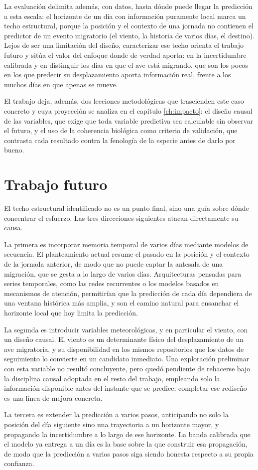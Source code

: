 La evaluación delimita además, con datos, hasta dónde puede llegar la predicción a esta
escala: el horizonte de un día con información puramente local marca un techo
estructural, porque la posición y el contexto de una jornada no contienen el predictor de
un evento migratorio (el viento, la historia de varios días, el destino). Lejos de ser
una limitación del diseño, caracterizar ese techo orienta el trabajo futuro y sitúa el
valor del enfoque donde de verdad aporta: en la incertidumbre calibrada y en distinguir los días en que el ave
está migrando, que son los pocos en los que predecir su desplazamiento aporta
información real, frente a los muchos días en que apenas se mueve.

El trabajo deja, además, dos lecciones metodológicas que trascienden este caso concreto
y cuya proyección se analiza en el capítulo \ref{ch:impacto}: el diseño causal de las
variables, que exige que toda variable predictiva sea calculable sin observar el futuro,
y el uso de la coherencia biológica como criterio de validación, que contrasta cada
resultado contra la fenología de la especie antes de darlo por bueno.

\section{Trabajo futuro}
\label{sec:concl-futuro}

El techo estructural identificado no es un punto final, sino una guía sobre dónde
concentrar el esfuerzo. Las tres direcciones siguientes atacan directamente su causa.

La primera es incorporar memoria temporal de varios días mediante modelos de secuencia.
El planteamiento actual resume el pasado en la posición y el contexto de la jornada
anterior, de modo que no puede captar la antesala de una migración, que se gesta a lo
largo de varios días. Arquitecturas pensadas para series temporales, como las redes
recurrentes o los modelos basados en mecanismos de atención, permitirían que la
predicción de cada día dependiera de una ventana histórica más amplia, y son el camino
natural para ensanchar el horizonte local que hoy limita la predicción.

La segunda es introducir variables meteorológicas, y en particular el viento, con un
diseño causal. El viento es un determinante físico del desplazamiento de un ave
migratoria, y su disponibilidad en los mismos repositorios que los datos de seguimiento
lo convierte en un candidato inmediato. Una exploración preliminar con esta variable no
resultó concluyente, pero quedó pendiente de rehacerse bajo la disciplina causal adoptada
en el resto del trabajo, empleando solo la información disponible antes del instante que
se predice; completar ese rediseño es una línea de mejora concreta.

La tercera es extender la predicción a varios pasos, anticipando no solo la posición del
día siguiente sino una trayectoria a un horizonte mayor, y propagando la incertidumbre a
lo largo de ese horizonte. La banda calibrada que el modelo ya entrega a un día es la base
sobre la que construir esa propagación, de modo que la predicción a varios pasos siga
siendo honesta respecto a su propia confianza.
